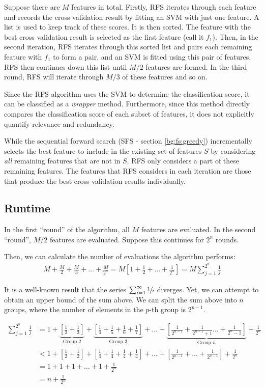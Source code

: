 \documentclass[12pt, twoside, a4paper]{report}
\begin{document}
Suppose there are $M$ features in total. Firstly, RFS iterates through each feature and records the cross validation result by fitting an SVM with just one feature. A list is used to keep track of these scores. It is then sorted. The feature with the best cross validation result is selected as the first feature (call it $f_1$). Then, in the second iteration, RFS iterates through this sorted list and pairs each remaining feature with $f_1$ to form a pair, and an SVM is fitted using this pair of features. RFS then continues down this list until $M/2$ features are formed. In the third round, RFS will iterate through $M/3$ of these features and so on.

Since the RFS algorithm uses the SVM to determine the classification score, it can be classified as a \textit{wrapper} method. Furthermore, since this method directly compares the classification score of each subset of features, it does not explicitly quantify relevance and redundancy.

While the sequential forward search (SFS - section \ref{bg:fs:greedy}) incrementally selects the best feature to include in the existing set of features $S$ by considering \textit{all} remaining features that are not in $S$, RFS only considers a part of these remaining features. The features that RFS considers in each iteration are those that produce the best cross validation results individually.


\subsection{Runtime}
In the first ``round'' of the algorithm, all $M$ features are evaluated. In the second ``round'', $M/2$ features are evaluated. Suppose this continues for $2^n$ rounds.

Then, we can calculate the number of evaluations the algorithm performs:
\begin{align*}
M+\frac{M}{2}+\frac{M}{3}+\dots+\frac{M}{2^n} = M\left[ 1+\frac{1}{2}+\dots+\frac{1}{2^n} \right]=M \sum_{j=1}^{2^n} \frac{1}{j}
\end{align*}

It is a well-known result that the series $\sum_{i=1}^{\infty} \sfrac{1}{i}$ diverges. Yet, we can attempt to obtain an upper bound of the sum above. We can split the sum above into $n$ groups, where the number of elements in the $p$-th group is $2^{p-1}$.

\begin{align*}
\sum_{j=1}^{2^n} \frac{1}{j}
&= 1 + \underbrace{\left[ \frac{1}{2} + \frac{1}{3} \right]}_{\text{Group 2}} + \underbrace{\left[ \frac{1}{4} + \frac{1}{5} + \frac{1}{6} + \frac{1}{7} \right]}_{\text{Group 3}} + \dots + \underbrace{\left[ \frac{1}{2^{n-1}} + \frac{1}{2^{n-1}+1} \dots + \frac{1}{2^{n}-1} \right]}_{\text{Group $n$}} + \frac{1}{2^n} \\
&< 1 + \left[ \frac{1}{2} + \frac{1}{2} \right] + \left[ \frac{1}{4} + \frac{1}{4} + \frac{1}{4} + \frac{1}{4} \right] + \dots + \left[ \frac{1}{2^{n-1}} + \dots + \frac{1}{2^{n-1}} \right] + \frac{1}{2^n} \\
&= 1+1+1+ \dots + 1 + \frac{1}{2^n} \\
&= n + \frac{1}{2^n}
\end{align*}
\end{document}
